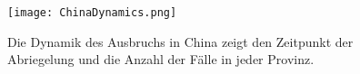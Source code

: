 \documentclass[onecolumn,journal]{IEEEtran}
\begin{document}
\renewcommand{\figurename}{Abb.}
\begin{figure}[H]
\begin{centering}
\captionsetup{justification=centering}
\texttt{[image: ChinaDynamics.png]}
\caption{Die Dynamik des Ausbruchs in China zeigt den Zeitpunkt der Abriegelung und die Anzahl der Fälle in jeder Provinz.}
\end{centering}
\end{figure}




% 
\end{document}
